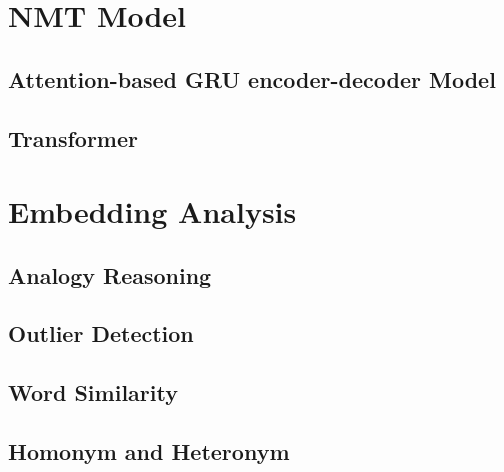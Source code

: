 



\section{NMT Model} \label{sec:nmt_model}


\subsection{Attention-based GRU encoder-decoder Model} \label{sec:rnn}



\subsection{Transformer} \label{sec:transformer}



\section{Embedding Analysis} \label{sec:embedding_analysis}


\subsection{Analogy Reasoning} \label{sec:analogy}


\subsection{Outlier Detection} \label{sec:outlier}


\subsection{Word Similarity} \label{sec:similarity}


\subsection{Homonym and Heteronym} \label{sec:homonym_heteronym}

